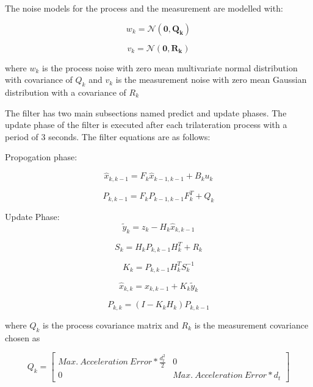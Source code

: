 The noise models for the process and the measurement are modelled with:

\begin{equation}
 w_k = \mathcal{N}(\mathbf{0,Q_k})
\end{equation}
	
\begin{equation}
v_k = \mathcal{N}(\mathbf{0,R_k})
\end{equation}
		
where $w_k$ is the process noise with zero mean multivariate normal distribution with covariance of $Q_k$ and $v_k$ is the measurement noise with zero mean Gaussian distribution with a covariance of $R_k$
		
The filter has two main subsections named predict and update phases. The update phase of the filter is executed after each trilateration process with a period of 3 seconds. The filter equations are as follows:
		
Propogation phase:

\begin{equation}
\hat{x}_{k,k-1} = F_k\hat{x}_{k-1,k-1} + B_ku_k
\end{equation}
		
\begin{equation}
 P_{k,k-1} = F_k P_{k-1,k-1}F^T_k + Q_k
\end{equation}
		
Update Phase:
\begin{equation}
\tilde{y}_k = z_k - H_k  \hat{x}_{k,k-1} 
\end{equation}

\begin{equation}
S_k = H_k P_{k,k-1} H^T_k + R_k
\end{equation}

\begin{equation}
K_k =  P_{k,k-1} H^T_kS_k^{-1}
\end{equation}
		
\begin{equation}
 \hat{x}_{k,k} =  \hat{x}_{k,k-1} + K_k \tilde{y}_k
\end{equation}
		
\begin{equation}
P_{k,k} = (I - K_kH_k)P_{k,k-1}
\end{equation}
		
where $Q_k$ is the process covariance matrix and $R_k$ is the measurement covariance chosen as 

\begin{equation}
Q_k = \begin{bmatrix}
Max.\ Acceleration\ Error * \frac{d^2_t}{2} & 0 \\
0 & Max.\ Acceleration\ Error * d_t
\end{bmatrix}
\end{equation}
		
